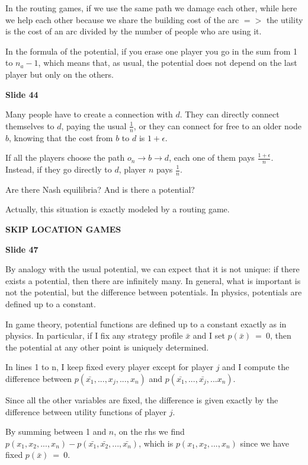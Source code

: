 \documentclass[pt11,a4paper,twoside,reqno,openright]{paper}
\begin{document}
\noindent In the routing games, if we use the same path we damage each other, 
while here we help each other because we share the building cost of the 
arc $=>$ the utility is the cost of an arc divided by the number of people 
who are using it.

\noindent In the formula of the potential, if you erase one player you go in 
the sum from 1 to $n_a-1$, which means that, as usual, the potential does not 
depend on the last player but only on the others.

\bigskip
\noindent \textbf{Slide 44}

\noindent Many people have to create a connection with $d$. They can directly 
connect themselves to $d$, paying the usual $\frac{1}{n}$, or they can connect 
for free to an older node $b$, knowing that the cost from $b$ to $d$ is 
$1+\epsilon$.

\noindent If all the players choose the path $o_n \rightarrow b \rightarrow 
d$, each one of them pays $\frac{1+\epsilon}{n}$. Instead, if they go directly 
to $d$, player $n$ pays $\frac{1}{n}$.

\noindent Are there Nash equilibria? And is there a potential?

\noindent Actually, this situation is exactly modeled by a routing game.

\bigskip
\noindent \textbf{SKIP LOCATION GAMES}

\bigskip
\noindent \textbf{Slide 47}

\noindent By analogy with the usual potential, we can expect that it is 
not unique: if there exists a potential, then there are infinitely many. 
In general, what is important is not the potential, but the difference 
between potentials. In physics, potentials are defined up to a constant.

\noindent In game theory, potential functions are defined up to a constant 
exactly as in physics. In particular, if I fix any strategy profile $\bar{x}$ 
and I set $p(\bar{x})~=~0$, then the potential at any other point is 
uniquely determined.

\noindent In lines 1 to n, I keep fixed every player except for player $j$ 
and I compute the difference between $p(\bar{x_1},...,x_j,...,x_n)$ and 
$p(\bar{x_1},...,\bar{x_j},...x_n)$.

\noindent Since all the other variables are fixed, the difference is given 
exactly by the difference between utility functions of player $j$.

\noindent By summing between 1 and $n$, on the rhs we find 
$p(x_1,x_2,...,x_n)-p(\bar{x_1},\bar{x_2},...,\bar{x_n})$, which is 
$p(x_1,x_2,...,x_n)$ since we have fixed $p(\bar{x})~=~0$.
\end{document}
